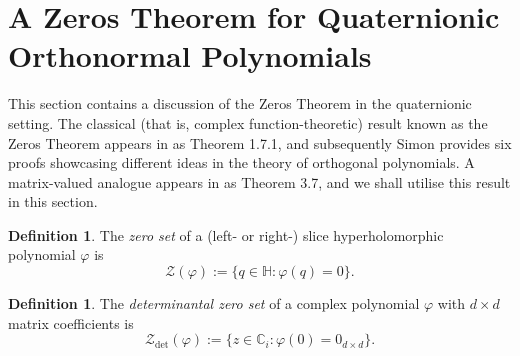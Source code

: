 \documentclass[11pt,reqno]{amsart}
\def\p{\varphi}
\def\CC{\mathbb{C}}
\def\HH{\mathbb{H}}
\def\cZ{\mathcal{Z}}
\theoremstyle{definition}
\newtheorem{definition}[theorem]{Definition}
\numberwithin{equation}{section}
\begin{document}
\section{A Zeros Theorem for Quaternionic Orthonormal Polynomials}

This section contains a discussion of the Zeros Theorem in the quaternionic setting. The classical (that is, complex function-theoretic) result known as the Zeros Theorem appears in \cite{Sim05a} as Theorem 1.7.1, and subsequently Simon provides six proofs showcasing different ideas in the theory of orthogonal polynomials. A matrix-valued analogue appears in \cite{DPS08} as Theorem 3.7, and we shall utilise this result in this section.

\begin{definition}
    The \emph{zero set} of a (left- or right-) slice hyperholomorphic polynomial \(\p\) is
    \[
        \cZ(\p) := \{q \in \HH : \p(q) = 0\}.
    \]
\end{definition}

\begin{definition}
    The \emph{determinantal zero set} of a complex polynomial \(\p\) with \(d \times d\) matrix coefficients is 
    \[
        \cZ_{\det}(\p) := \{z \in \CC_i : \p(0) = 0_{d\times d}\}.
    \]
\end{definition}
\end{document}
